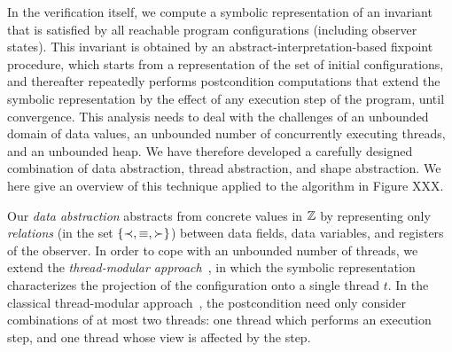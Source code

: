 In the  verification itself, we compute a symbolic representation
of an invariant that is satisfied by all reachable program configurations (including observer states).
This invariant is obtained by an abstract-interpretation-based
fixpoint procedure, which starts
from a representation of the set of initial configurations, and
thereafter repeatedly performs
postcondition computations that extend the
symbolic representation by the effect of any execution step of the program,
until convergence.
This analysis needs to deal with the challenges of an unbounded domain of
data values, an unbounded number of concurrently executing threads, and an
unbounded heap. We have therefore developed a carefully designed combination of
data abstraction, thread abstraction, and shape abstraction. 
We here give an overview of this technique applied to the algorithm in
Figure XXX.

Our {\em data abstraction} abstracts from concrete values in
${\mathbb Z}$ by representing only
{\em relations}  (in the set $\left\{\prec,\equiv,\succ\right\}$) between data fields,
data variables, and registers of the observer.
In order to cope with an unbounded number of threads,
we extend the {\em thread-modular approach}~\cite{BLMRS:cav08}, in which
the symbolic representation characterizes
the projection of the configuration onto a single thread $t$.
In the classical thread-modular approach~\cite{BLMRS:cav08}, the postcondition need
only consider combinations of at most two threads: one thread which performs an execution step, and
one thread whose view is affected by the step.

